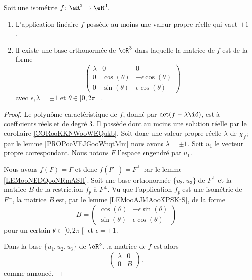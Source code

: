 \begin{proposition}      \label{PROPooOMORooWzsrDB}
    Soit une isométrie \( f\colon \eR^3\to \eR^3\).
    \begin{enumerate}
        \item
            L'application linéaire \( f\) possède au moins une valeur propre réelle qui vaut \( \pm 1\).
        \item
            Il existe une base orthonormée de \( \eR^3\) dans laquelle la matrice de \( f\) est de la forme
            \begin{equation}
                \begin{pmatrix}
                    \lambda    &   0    &   0    \\
                    0    &   \cos(\theta)    &   -\epsilon\cos(\theta)    \\
                    0    &   \sin(\theta)    &   \epsilon\cos(\theta)
                \end{pmatrix}
            \end{equation}
            avec \( \epsilon,\lambda=\pm 1\) et \( \theta\in \mathopen[ 0 , 2\pi \mathclose[\).
    \end{enumerate}
\end{proposition}

\begin{proof}
    Le polynôme caractéristique de \( f\), donné par \( \det(f-\lambda\id)\), est à coefficients réels et de degré \( 3\). Il possède dont au moins une solution réelle par le corollaire \ref{CORooKKNWooWEQukb}. Soit donc une valeur propre réelle \( \lambda\) de \( \chi_f\); par le lemme \ref{PROPooVEJGooWnqtMm} nous avons \( \lambda=\pm 1\). Soit \( u_1\) le vecteur propre correspondant. Nous notons \( F\) l'espace engendré par \( u_1\).

    Nous avons \( f(F)=F\) et donc \( f(F^{\perp})=F^{\perp}\) par le lemme \ref{LEMooNEDQooNRmASH}. Soit une base orthonormée \( \{ u_2,u_3 \}\) de \( F^{\perp}\) et la matrice \( B\) de la restriction \( f_{p}\) à \( F^{\perp}\). Vu que l'application \( f_p\) est une isométrie de \( F^{\perp}\), la matrice \( B\) est, par le lemme \ref{LEMooAJMAooXPSKtS}, de la forme
    \begin{equation}
        B=\begin{pmatrix}
            \cos(\theta)    &   -\epsilon\sin(\theta)    \\ 
            \sin(\theta)    &   \epsilon\cos(\theta)    
        \end{pmatrix}
    \end{equation}
    pour un certain \( \theta\in\mathopen[ 0 , 2\pi \mathclose[\) et \( \epsilon=\pm 1\).

    Dans la base \( \{u_1,u_2,u_3\}\) de \( \eR^3\), la matrice de \( f\) est alors
    \begin{equation}
        \begin{pmatrix}
            \lambda    &   0    \\ 
            0    &   B    
        \end{pmatrix},
    \end{equation}
    comme annoncé.
\end{proof}

